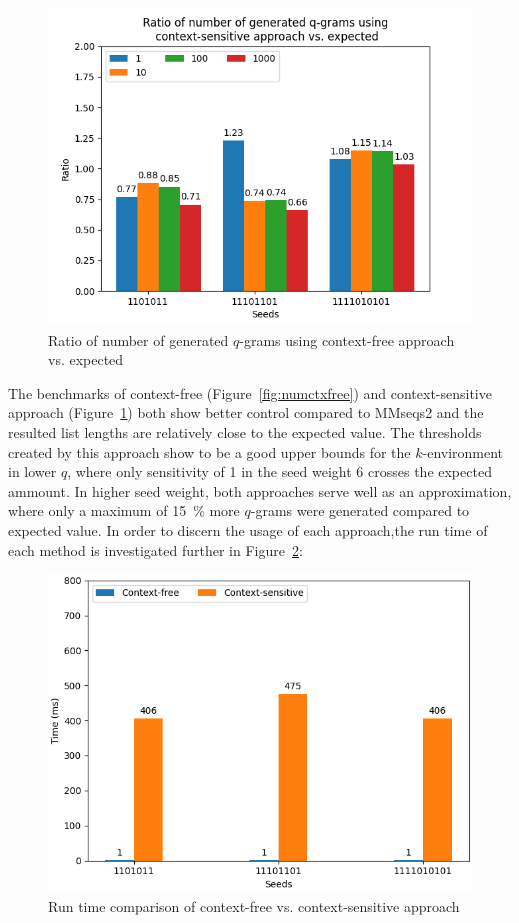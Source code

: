 \documentclass[twoside,a4paper,bsc]{master}
\newcommand{\Qgram}[1]{\(#1\)-gram}
\begin{document}
\begin{figure}
\centering
\includegraphics[scale=0.6]{graphics/threshold_contextsens.png}
\caption{Ratio of number of generated \Qgram{q}s using context-free
approach vs. expected}
\label{fig:numctxsens}
\end{figure}
The benchmarks of context-free (Figure~\ref{fig:numctxfree}) and
context-sensitive approach (Figure~\ref{fig:numctxsens}) both show better
control compared to MMseqs2 and the resulted list lengths are relatively
close to the expected value. The thresholds created by this approach show
to be a good upper bounds for the \(k\)-environment in lower \(q\), where
only sensitivity of 1 in the seed weight 6 crosses the expected ammount. In
higher seed weight, both approaches serve well as an approximation, where
only a maximum of 15~\% more \Qgram{q}s were generated compared to
expected value. In order to discern the usage of each approach,the run time
of each method is investigated further in Figure~\ref{fig:sens_runtime}:
\begin{figure}
\centering
\includegraphics[scale=0.6]{graphics/speed_threshold.png}
\caption{Run time comparison of context-free vs. context-sensitive
approach}
\label{fig:sens_runtime}
\end{figure}
\end{document}
